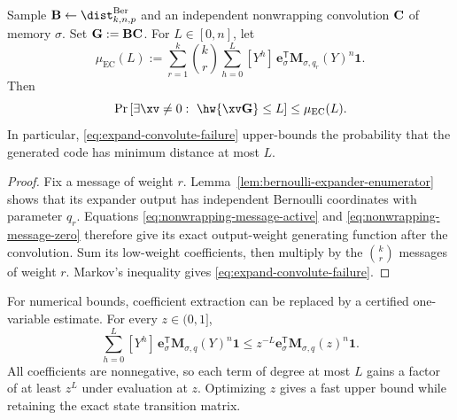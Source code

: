 \begin{theorem}
\label{thm:expand-convolute-first-moment}
Sample $\B\gets\dist^{\mathrm{Ber}}_{k,n,p}$ and an independent nonwrapping
convolution $\mathbf C$ of memory $\sigma$.  Set $\mathbf G:=\mathbf B\mathbf C$.  For $L\in[0,n]$, let
\begin{equation}
 \mu_{\mathrm{EC}}(L)
   :=
 \sum_{r=1}^{k}\binom{k}{r}
 \sum_{h=0}^{L}[Y^h]\,
 \mathbf e_\sigma^\mathsf{T}\mathbf M_{\sigma,q_r}(Y)^n\mathbf 1.
 \label{eq:expand-convolute-first-moment}
\end{equation}
Then
\begin{equation}
 \Pr\left[\exists\xv\neq0:\ \hw{\xv\G}\leq L\right]
 \leq \mu_{\mathrm{EC}}(L).
 \label{eq:expand-convolute-failure}
\end{equation}
In particular, \eqref{eq:expand-convolute-failure} upper-bounds the probability
that the generated code has minimum distance at most $L$.
\end{theorem}

\begin{proof}
Fix a message of weight $r$.  Lemma~\ref{lem:bernoulli-expander-enumerator}
shows that its expander output has independent Bernoulli coordinates with
parameter $q_r$.  Equations \eqref{eq:nonwrapping-message-active} and
\eqref{eq:nonwrapping-message-zero} therefore give its exact output-weight
generating function after the convolution.  Sum its low-weight coefficients,
then multiply by the $\binom{k}{r}$ messages of weight $r$.  Markov's inequality
gives \eqref{eq:expand-convolute-failure}.
\end{proof}

For numerical bounds, coefficient extraction can be replaced by a certified
one-variable estimate.  For every $z\in(0,1]$,
\begin{equation}
 \sum_{h=0}^{L}[Y^h]\,
 \mathbf e_\sigma^\mathsf{T}\mathbf M_{\sigma,q}(Y)^n\mathbf 1
 \leq
 z^{-L}\mathbf e_\sigma^\mathsf{T}\mathbf M_{\sigma,q}(z)^n\mathbf 1.
 \label{eq:expand-convolute-chernoff}
\end{equation}
All coefficients are nonnegative, so each term of degree at most $L$ gains a
factor of at least $z^L$ under evaluation at $z$.  Optimizing $z$ gives a fast
upper bound while retaining the exact state transition matrix.

